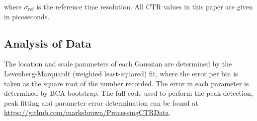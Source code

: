 where $\sigma_\text{ref}$ is the reference time resolution. All CTR values in this paper are given in picoseconds.

\subsection{Analysis of Data}
The location and scale parameters of each Gaussian are determined by the Levenberg-Marquardt (weighted least-squared) fit, where the error per bin is taken as the square root of the number recorded. The error in each parameter is determined by BCA bootstrap. The full code used to perform the peak detection, peak fitting and parameter error determination can be found at \href{https://github.com/marksbrown/ProcessingCTRData}{https://github.com/marksbrown/ProcessingCTRData}.

